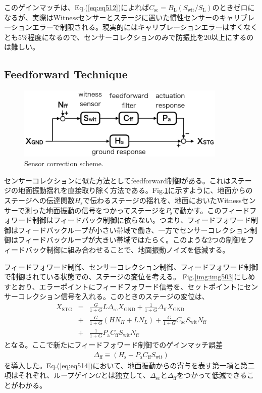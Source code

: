 このゲインマッチは、Eq.(\ref{eq:eq512})によれば$C_{\mathrm{sc}}=B_{\mathrm{L}}(S_{\mathrm{wit}}/S_{\mathrm{L}})$のときゼロになるが、実際はWitnessセンサーとステージに置いた慣性センサーのキャリブレーションエラーで制限される。現実的にはキャリブレーションエラーはすくなくとも5\%程度になるので、センサーコレクションのみで防振比を20以上にするのは難しい\cite{hua2005low}。


\subsection{Feedforward Technique}
\begin{figure}[h]
  \begin{center}   
    \includegraphics[width=10cm]{./img_chap5/img506.png}
    \caption{Sensor correction scheme.} \label{img:img506}
  \end{center}
\end{figure}
センサーコレクションに似た方法としてfeedforward制御がある。これはステージの地面振動揺れを直接取り除く方法である。Fig.\ref{img:img506}に示すように、地面からのステージへの伝達関数$H_{\mathrm{s}}$で伝わるステージの揺れを、地面においたWitnessセンサーで測った地面振動の信号をつかってステージを$P_{\mathrm{s}}$で動かす。このフィードフォワード制御はフィードバック制御に依らない。つまり、フィードフォワード制御はフィードバックループが小さい帯域で働き、一方でセンサーコレクション制御はフィードバックループが大きい帯域ではたらく。このような2つの制御をフィードバック制御に組み合わせることで、地面振動ノイズを低減する。

フィードフォワード制御、センサーコレクション制御、フィードフォワード制御で制御されている状態での、ステージの変位を考える。
Fig.\ref{img:img503}にしめすとおり、エラーポイントにフィードフォワード信号を、セットポイントにセンサーコレクション信号を入れる。このときのステージの変位は、
\begin{eqnarray}\nonumber
  X_{\mathrm{STG}} &=&\frac{G}{1+G}L\Delta_{\mathrm{sc}} X_{\mathrm{GND}} + \frac{1}{1+G} \Delta_{\mathrm{ff}} X_{\mathrm{GND}}\\ \nonumber
  &+& \frac{G}{1+G}\left(HN_{H}+LN_{L}\right) + \frac{G}{1+G}C_{\mathrm{sc}}S_{\mathrm{wit}}N_{\mathrm{ff}} \\ 
  &+& \frac{1}{1+G}P_{\mathrm{a}} C_{\mathrm{ff}}S_{\mathrm{wit}}N_{\mathrm{ff}} \label{eq:eq514}
\end{eqnarray}
となる。ここで新たにフィードフォワード制御でのゲインマッチ誤差
\begin{eqnarray}
  \Delta_{\mathrm{ff}} \equiv \left(H_{\mathrm{s}}-P_{\mathrm{a}}C_{\mathrm{ff}}S_{\mathrm{wit}}\right) \label{eq:eq515}
\end{eqnarray}
を導入した。Eq.(\ref{eq:eq514})において、地面振動からの寄与を表す第一項と第二項はそれぞれ、ループゲイン$G$とは独立して、$\Delta_{\mathrm{sc}}$と$\Delta_{\mathrm{ff}}$をつかって低減できることがわかる。



